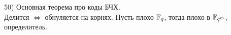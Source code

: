 50) Основная теорема про коды БЧХ.\\
Делится $\Leftrightarrow$ обнуляется на корнях. Пусть плохо $\mathbb{F}_q$, тогда плохо в $\mathbb{F}_{q^m}$, определитель.\\
